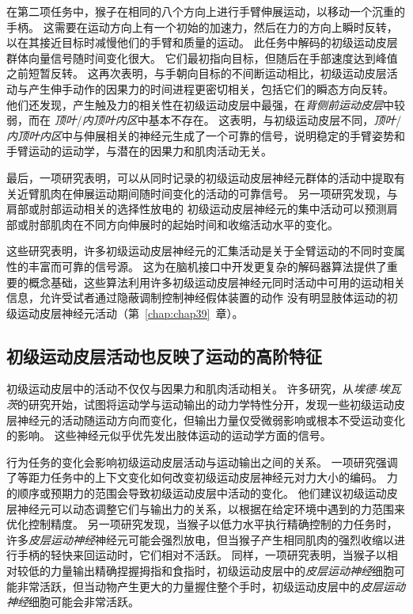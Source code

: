 在第二项任务中，猴子在相同的八个方向上进行手臂伸展运动，以移动一个沉重的手柄。
这需要在运动方向上有一个初始的加速力，然后在力的方向上瞬时反转，以在其接近目标时减慢他们的手臂和质量的运动。
此任务中解码的初级运动皮层群体向量信号随时间变化很大。
它们最初指向目标，但随后在手部速度达到峰值之前短暂反转。
这再次表明，与手朝向目标的不间断运动相比，初级运动皮层活动与产生伸手动作的因果力的时间进程更密切相关，包括它们的瞬态方向反转。
他们还发现，产生触及力的相关性在初级运动皮层中最强，在\textit{背侧前运动皮层}中较弱，而在 \textit{顶叶}/\textit{内顶叶内区}中基本不存在。
这表明，与初级运动皮层不同，\textit{顶叶}/\textit{内顶叶内区}中与伸展相关的神经元生成了一个可靠的信号，说明稳定的手臂姿势和手臂运动的运动学，与潜在的因果力和肌肉活动无关。


最后，一项研究表明，可以从同时记录的初级运动皮层神经元群体的活动中提取有关近臂肌肉在伸展运动期间随时间变化的活动的可靠信号。
另一项研究发现，与肩部或肘部运动相关的选择性放电的 初级运动皮层神经元的集中活动可以预测肩部或肘部肌肉在不同方向伸展时的起始时间和收缩活动水平的变化。


这些研究表明，许多初级运动皮层神经元的汇集活动是关于全臂运动的不同时变属性的丰富而可靠的信号源。
这为在脑机接口中开发更复杂的解码器算法提供了重要的概念基础，这些算法利用许多初级运动皮层神经元同时活动中可用的运动相关信息，允许受试者通过隐蔽调制控制神经假体装置的动作 没有明显肢体运动的初级运动皮层神经元活动（第~\ref{chap:chap39}~章）。



\subsection{初级运动皮层活动也反映了运动的高阶特征}

初级运动皮层中的活动不仅仅与因果力和肌肉活动相关。
许多研究，从\textit{埃德$\cdot$埃瓦茨}的研究开始，试图将运动学与运动输出的动力学特性分开，发现一些初级运动皮层神经元的活动随运动方向而变化，但输出力量仅受微弱影响或根本不受运动变化的影响。
这些神经元似乎优先发出肢体运动的运动学方面的信号。


行为任务的变化会影响初级运动皮层活动与运动输出之间的关系。
一项研究强调了等距力任务中的上下文变化如何改变初级运动皮层神经元对力大小的编码。
力的顺序或预期力的范围会导致初级运动皮层中活动的变化。
他们建议初级运动皮层神经元可以动态调整它们与输出力的关系，以根据在给定环境中遇到的力范围来优化控制精度。
另一项研究发现，当猴子以低力水平执行精确控制的力任务时，许多\textit{皮层运动神经}神经元可能会强烈放电，但当猴子产生相同肌肉的强烈收缩以进行手柄的轻快来回运动时，它们相对不活跃。
同样，一项研究表明，当猴子以相对较低的力量输出精确捏握拇指和食指时，初级运动皮层中的\textit{皮层运动神经}细胞可能非常活跃，但当动物产生更大的力量握住整个手时，初级运动皮层中的\textit{皮层运动神经}细胞可能会非常活跃。


